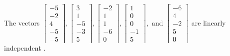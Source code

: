 \begin{exercise}
\begin{exerciseStatement}
  \end{exerciseStatement}
  \begin{exerciseAnswer}
   The vectors \(\left[\begin{array}{r}
-5 \\
-2 \\
4 \\
-5 \\
-5
\end{array}\right] , \left[\begin{array}{r}
3 \\
1 \\
-5 \\
-3 \\
5
\end{array}\right] , \left[\begin{array}{r}
-2 \\
1 \\
1 \\
-6 \\
0
\end{array}\right] , \left[\begin{array}{r}
1 \\
0 \\
0 \\
-1 \\
5
\end{array}\right] , \text{ and } \left[\begin{array}{r}
-6 \\
4 \\
-2 \\
5 \\
0
\end{array}\right]\) are 
  	 linearly independent  .
  


  \end{exerciseAnswer}
\end{exercise}